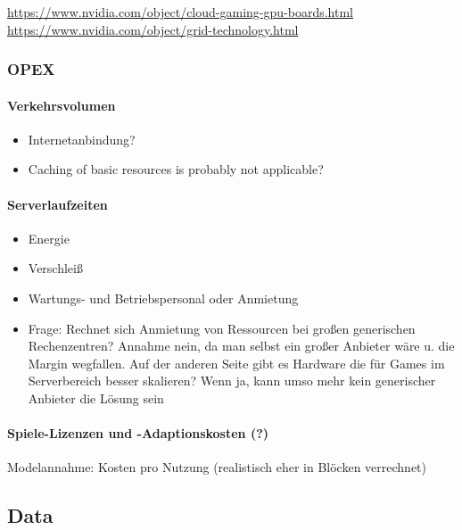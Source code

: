 \url{https://www.nvidia.com/object/cloud-gaming-gpu-boards.html}
\url{https://www.nvidia.com/object/grid-technology.html}


\subsubsection{OPEX}

\paragraph{Verkehrsvolumen}

\begin{itemize}
	\item Internetanbindung?
	\item Caching of basic resources is probably not applicable?
\end{itemize}

\paragraph{Serverlaufzeiten}

\begin{itemize}
	\item Energie
	\item Verschleiß
	\item Wartungs- und Betriebspersonal oder Anmietung
	\item Frage: Rechnet sich Anmietung von Ressourcen bei großen generischen Rechenzentren? Annahme nein, da man selbst ein großer Anbieter wäre u. die Margin wegfallen. Auf der anderen Seite gibt es Hardware die für Games im Serverbereich besser skalieren? Wenn ja, kann umso mehr kein generischer Anbieter die Lösung sein
\end{itemize}

\paragraph{Spiele-Lizenzen und -Adaptionskosten (?)}
Modelannahme: Kosten pro Nutzung (realistisch eher in Blöcken verrechnet)





\subsection{Data}

